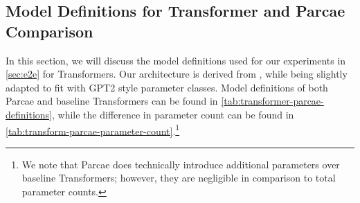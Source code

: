 \subsection{Model Definitions for Transformer and Parcae Comparison}
\label{sec:trans-parcae-model-def}

In this section, we will discuss the model definitions used for our experiments in \cref{sec:e2e} for Transformers. Our architecture is derived from \citet{nanochat}, while being slightly adapted to fit with GPT2 \citep{radford2019language} style parameter classes. Model definitions of both Parcae and baseline Transformers can be found in \cref{tab:transformer-parcae-definitions}, while the difference in parameter count can be found in \cref{tab:transform-parcae-parameter-count}.\footnote{We note that Parcae does technically introduce additional parameters over baseline Transformers; however, they are negligible in comparison to total parameter counts.}

